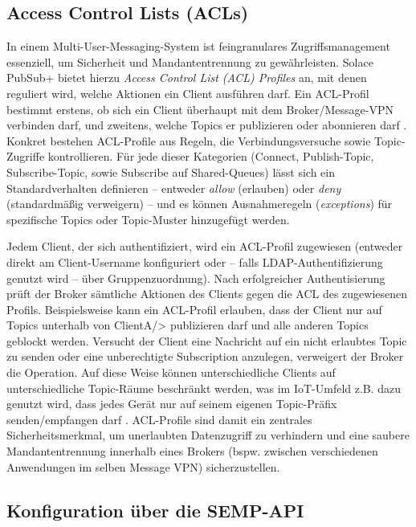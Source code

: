 \subsection{Access Control Lists (ACLs)}

In einem Multi-User-Messaging-System ist feingranulares Zugriffsmanagement essenziell, um Sicherheit und Mandantentrennung zu gewährleisten. Solace PubSub+ bietet hierzu \textit{Access Control List (ACL) Profiles} an, mit denen reguliert wird, welche Aktionen ein Client ausführen darf. Ein ACL-Profil bestimmt erstens, ob sich ein Client überhaupt mit dem Broker/Message-VPN verbinden darf, und zweitens, welche Topics er publizieren oder abonnieren darf \cite{SolaceACL}. Konkret bestehen ACL-Profile aus Regeln, die Verbindungsversuche sowie Topic-Zugriffe kontrollieren. Für jede dieser Kategorien (Connect, Publish-Topic, Subscribe-Topic, sowie Subscribe auf Shared-Queues) lässt sich ein Standardverhalten definieren – entweder \textit{allow} (erlauben) oder \textit{deny} (standardmäßig verweigern) – und es können Ausnahmeregeln (\textit{exceptions}) für spezifische Topics oder Topic-Muster hinzugefügt werden.

Jedem Client, der sich authentifiziert, wird ein ACL-Profil zugewiesen (entweder direkt am Client-Username konfiguriert oder – falls LDAP-Authentifizierung genutzt wird – über Gruppenzuordnung). Nach erfolgreicher Authentisierung prüft der Broker sämtliche Aktionen des Clients gegen die ACL des zugewiesenen Profils. Beispielsweise kann ein ACL-Profil erlauben, dass der Client nur auf Topics unterhalb von ClientA/> publizieren darf und alle anderen Topics geblockt werden. Versucht der Client eine Nachricht auf ein nicht erlaubtes Topic zu senden oder eine unberechtigte Subscription anzulegen, verweigert der Broker die Operation. Auf diese Weise können unterschiedliche Clients auf unterschiedliche Topic-Räume beschränkt werden, was im IoT-Umfeld z.B. dazu genutzt wird, dass jedes Gerät nur auf seinem eigenen Topic-Präfix senden/empfangen darf \cite{AvnetPSK}. ACL-Profile sind damit ein zentrales Sicherheitsmerkmal, um unerlaubten Datenzugriff zu verhindern und eine saubere Mandantentrennung innerhalb eines Brokers (bspw. zwischen verschiedenen Anwendungen im selben Message VPN) sicherzustellen.

\subsection{Konfiguration über die SEMP-API}

